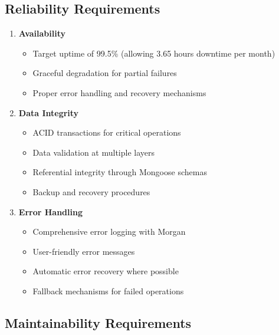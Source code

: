 \documentclass[12pt,a4paper]{report}
\begin{document}
\subsection{Reliability Requirements}

\begin{enumerate}[leftmargin=*]
    \item \textbf{Availability}
    \begin{itemize}
        \item Target uptime of 99.5\% (allowing 3.65 hours downtime per month)
        \item Graceful degradation for partial failures
        \item Proper error handling and recovery mechanisms
    \end{itemize}
    
    \item \textbf{Data Integrity}
    \begin{itemize}
        \item ACID transactions for critical operations
        \item Data validation at multiple layers
        \item Referential integrity through Mongoose schemas
        \item Backup and recovery procedures
    \end{itemize}
    
    \item \textbf{Error Handling}
    \begin{itemize}
        \item Comprehensive error logging with Morgan
        \item User-friendly error messages
        \item Automatic error recovery where possible
        \item Fallback mechanisms for failed operations
    \end{itemize}
\end{enumerate}

\subsection{Maintainability Requirements}
\end{document}
